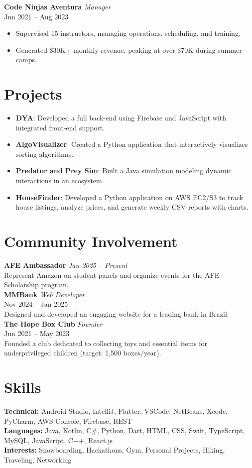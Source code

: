 \documentclass[a4paper,10pt]{article}
\begin{document}
\textbf{Code Ninjas Aventura} \hfill \textit{Manager}\\
Jun 2021 -- Aug 2023
\begin{itemize}
    \item Supervised 15 instructors, managing operations, scheduling, and training.
    \item Generated \$30K+ monthly revenue, peaking at over \$70K during summer camps.
\end{itemize}

\section*{Projects}
\begin{itemize}
    \item \textbf{DYA}: Developed a full back-end using Firebase and JavaScript with integrated front-end support.
    \item \textbf{AlgoVisualizer}: Created a Python application that interactively visualizes sorting algorithms.
    \item \textbf{Predator and Prey Sim}: Built a Java simulation modeling dynamic interactions in an ecosystem.
    \item \textbf{HouseFinder}: Developed a Python application on AWS EC2/S3 to track house listings, analyze prices, and generate weekly CSV reports with charts.
\end{itemize}

\section*{Community Involvement}
\textbf{AFE Ambassador} \hfill \textit{Jan 2025 -- Present}\\
Represent Amazon on student panels and organize events for the AFE Scholarship program.\\[0.5em]

\textbf{MMBank} \hfill \textit{Web Developer}\\
Nov 2024 -- Jan 2025\\
Designed and developed an engaging website for a leading bank in Brazil.\\[0.5em]

\textbf{The Hope Box Club} \hfill \textit{Founder}\\
Jun 2021 -- May 2023\\
Founded a club dedicated to collecting toys and essential items for underprivileged children (target: 1,500 boxes/year).

\section*{Skills}
\textbf{Technical:} Android Studio, IntelliJ, Flutter, VSCode, NetBeans, Xcode, PyCharm, AWS Console, Firebase, REST\\[0.5em]
\textbf{Languages:} Java, Kotlin, C\#, Python, Dart, HTML, CSS, Swift, TypeScript, MySQL, JavaScript, C++, React.js\\[0.5em]
\textbf{Interests:} Snowboarding, Hackathons, Gym, Personal Projects, Hiking, Traveling, Networking
\end{document}
